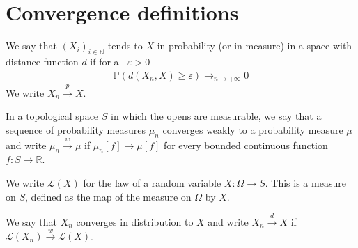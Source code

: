 \chapter{Convergence definitions}

\begin{definition}\label{def:cvg_probability}
\mathlibok
{}
We say that $(X_i)_{i \in \mathbb{N}}$ tends to $X$ in probability (or in measure) in a space with distance function $d$ if for all $\varepsilon > 0$
\begin{align*}
\mathbb{P}(d(X_n, X) \ge \varepsilon) \to_{n \to +\infty} 0
\end{align*}
We write $X_n \xrightarrow{p} X$.
\end{definition}

\begin{definition}\label{def:weak_cvg_measure}
\mathlibok
{}
In a topological space $S$ in which the opens are measurable, we say that a sequence of probability measures $\mu_n$ converges weakly to a probability measure $\mu$ and write $\mu_n \xrightarrow{w} \mu$ if $\mu_n[f] \to \mu[f]$ for every bounded continuous function $f : S \to \mathbb{R}$.
\end{definition}

We write $\mathcal L(X)$ for the law of a random variable $X : \Omega \to S$. This is a measure on $S$, defined as the map of the measure on $\Omega$ by $X$.

\begin{definition}\label{def:cvg_distribution}
We say that $X_n$ converges in distribution to $X$ and write $X_n \xrightarrow{d} X$ if $\mathcal L(X_n) \xrightarrow{w} \mathcal L(X)$.
\end{definition}